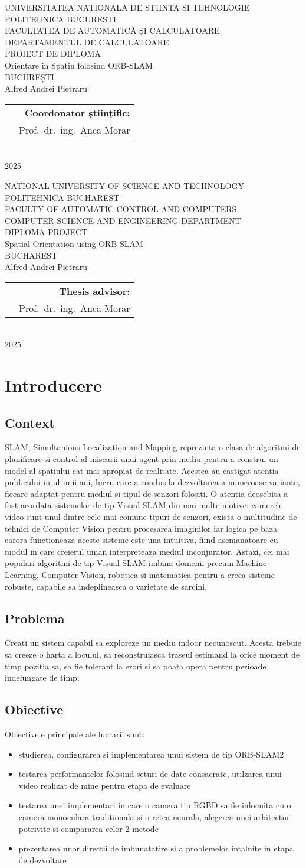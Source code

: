 \documentclass[12pt,a4paper]{report}
\makeatletter
\newcommand{\HeaderLineSpace}{-0.25cm}
\newcommand{\UniTextRO}{UNIVERSITATEA NATIONALA DE STIINTA SI TEHNOLOGIE POLITEHNICA BUCURESTI \\[\HeaderLineSpace] 
FACULTATEA DE AUTOMATICĂ ȘI CALCULATOARE \\[\HeaderLineSpace]
DEPARTAMENTUL DE CALCULATOARE\\}
\newcommand{\DiplomaRO}{PROIECT DE DIPLOMA}
\newcommand{\AdvisorRO}{Coordonator științific:}
\newcommand{\BucRO}{BUCUREȘTI}
\newcommand{\UniTextEN}{NATIONAL UNIVERSITY OF SCIENCE AND TECHNOLOGY POLITEHNICA BUCHAREST \\[\HeaderLineSpace]
FACULTY OF AUTOMATIC CONTROL AND COMPUTERS \\[\HeaderLineSpace]
COMPUTER SCIENCE AND ENGINEERING DEPARTMENT\\}
\newcommand{\DiplomaEN}{DIPLOMA PROJECT}
\newcommand{\AdvisorEN}{Thesis advisor:}
\newcommand{\BucEN}{BUCHAREST}
\newcommand{\ProjectTitleRO}{Orientare in Spatiu folosind ORB-SLAM}
\newcommand{\ProjectTitleEN}{Spatial Orientation using ORB-SLAM}
\newcommand{\frontPage}[6]{
\begin{titlepage}
\begin{center}
{\Large #1}  %
\vspace{50pt}
\vspace{105pt}
{\Huge #2}\\  %
\vspace{40pt}
{\Large #3}\\ \vspace{0pt}  %
{\Large #4}\\     %
\vspace{40pt}
{\LARGE Alfred Andrei Pietraru}\\   %
\end{center}
\vspace{60pt}
\begin{tabular*}{\textwidth}{@{\extracolsep{\fill}}p{6cm}r}
&{\large\textbf{#5}}\vspace{10pt}\\      %
&{\large Prof.\ dr.\ ing.\ Anca Morar}   %
\end{tabular*}
\vspace{20pt}
\begin{center}
{\large\textbf{#6}}\\    %
\vspace{0pt}
{\normalsize 2025}
\end{center}
\end{titlepage}
}
\newcommand{\frontPageRO}{\frontPage{\UniTextRO}{\DiplomaRO}{\ProjectTitleRO}{\BucRO}{\AdvisorRO}}
\newcommand{\frontPageEN}{\frontPage{\UniTextEN}{\DiplomaEN}{\ProjectTitleEN}{\BucEN}{\AdvisorEN}}
\makeatother
\begin{document}
\frontPageRO{}
\frontPageEN{}
\AbstractPage{}
\chapter{Introducere}
\section{Context}
SLAM, Simultanious Localization and Mapping reprezinta o clasa de algoritmi de planificare 
si control al miscarii unui agent prin mediu pentru a construi un model al spatiului cat
mai apropiat de realitate. Acestea au castigat atentia publicului in ultimii ani, lucru care
a condus la dezvoltarea a numeroase variante, fiecare adaptat pentru mediul si tipul de
senzori folositi. O atentia deosebita a fost acordata sistemelor de tip Visual SLAM din mai
multe motive: camerele video sunt unul dintre cele mai comune tipuri de senzori, exista o 
multitudine de tehnici de Computer Vision pentru procesarea imaginilor iar logica pe baza 
carora functioneaza aceste sisteme este una intuitiva, fiind asemanatoare cu modul in care 
creierul uman interpreteaza mediul inconjurator. Astazi, cei mai populari algoritmi 
de tip Visual SLAM imbina domenii precum Machine Learning, Computer Vision, robotica si 
matematica pentru a creea sisteme robuste, capabile sa indeplineasca o varietate de sarcini.    
\section{Problema}
Creati un sistem capabil sa exploreze un mediu indoor necunoscut. Acesta trebuie sa creeze 
o harta a locului, sa reconstruiasca traseul estimand la orice moment de timp pozitia 
sa, sa fie tolerant la erori si sa poata opera pentru perioade indelungate de timp.    
\section{Obiective}
Obiectivele principale ale lucrarii sunt:
\begin{itemize}
    \item studierea, configurarea si implementarea unui sistem de tip ORB-SLAM2
    \item testarea performantelor folosind seturi de date consacrate, utilzarea unui video
    realizat de mine pentru etapa de evaluare  
    \item testarea unei implementari in care o camera tip RGBD sa fie inlocuita cu o camera
    monoculara traditionala si o retea neurala, alegerea unei arhitecturi potrivite si 
    compararea celor 2 metode
    \item prezentarea unor directii de imbunatatire si a problemelor intalnite in etapa de 
    dezvoltare 
\end{itemize}
\end{document}
